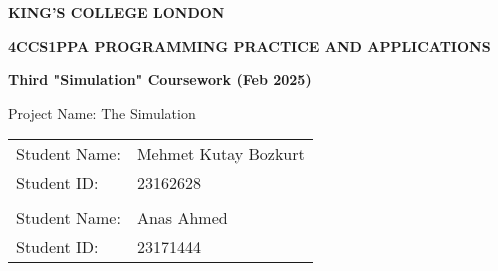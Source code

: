 \documentclass[10pt, a4paper]{scrartcl}
\begin{document}

  \begin{titlepage}
    \begin{center}
      \LARGE
      \textbf{KING'S COLLEGE LONDON}

      \vspace{2cm}

      \begin{adjustwidth}{-1cm}{-1cm}
        \centering
        \Large
        \textbf{4CCS1PPA PROGRAMMING PRACTICE AND APPLICATIONS}
      \end{adjustwidth}

      \vspace{0.5cm}

      \Large
      \textbf{Third "Simulation" Coursework (Feb 2025)}

      \vspace{2cm}

      \Large
      Project Name: The Simulation

      \vspace{1cm}

      \Large
      \begin{tabular}{l l}
        Student Name: & Mehmet Kutay Bozkurt \\
        Student ID: & 23162628 \\
        \vspace{0.5cm} & \\
        Student Name: & Anas Ahmed \\
        Student ID: & 23171444\end{tabular}
    \end{center}
  \end{titlepage}
\end{document}
